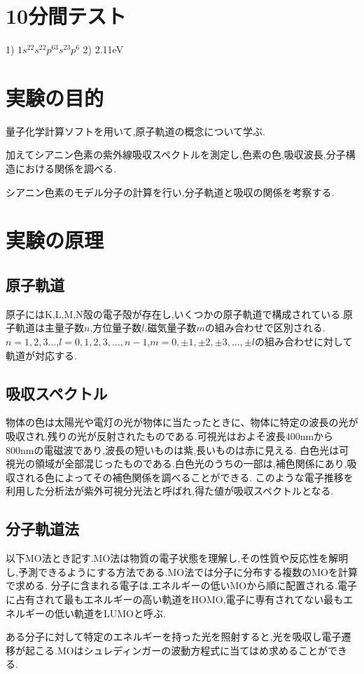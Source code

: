 \documentclass[a4j,10pt,dvipdfmx]{jarticle}
\begin{document}
\section{10分間テスト}
 1) $1s^22s^22p^63s^23p^6$
 2) 2.11eV
  \section{実験の目的}
  量子化学計算ソフトを用いて,原子軌道の概念について学ぶ.
  
  加えてシアニン色素の紫外線吸収スペクトルを測定し,色素の色,吸収波長,分子構造における関係を調べる.

  シアニン色素のモデル分子の計算を行い,分子軌道と吸収の関係を考察する.

  \section{実験の原理}
  \subsection{原子軌道}
  原子にはK,L,M,N殻の電子殻が存在し,いくつかの原子軌道で構成されている.原子軌道は主量子数$n$,方位量子数$l$,磁気量子数$m$の組み合わせで区別される.
  $n=1,2,3...$,$l= 0,1,2,3,...,n-1$,$m=0,\pm1,\pm2,\pm3,...,\pm{l}$の組み合わせに対して軌道が対応する.


  \subsection{吸収スペクトル}
  物体の色は太陽光や電灯の光が物体に当たったときに、物体に特定の波長の光が吸収され,残りの光が反射されたものである.可視光はおよそ波長400nmから800nmの電磁波であり,波長の短いものは紫,長いものは赤に見える.
  白色光は可視光の領域が全部混じったものである.白色光のうちの一部は,補色関係にあり,吸収される色によってその補色関係を調べることができる.
  このような電子推移を利用した分析法が紫外可視分光法と呼ばれ,得た値が吸収スペクトルとなる.
  \subsection{分子軌道法}
  以下MO法とき記す.MO法は物質の電子状態を理解し,その性質や反応性を解明し,予測できるようにする方法である.MO法では分子に分布する複数のMOを計算で求める.
  分子に含まれる電子は,エネルギーの低いMOから順に配置される.電子に占有されて最もエネルギーの高い軌道をHOMO,電子に専有されてない最もエネルギーの低い軌道をLUMOと呼ぶ.

  ある分子に対して特定のエネルギーを持った光を照射すると,光を吸収し電子遷移が起こる.MOはシュレディンガーの波動方程式に当てはめ求めることができる.
\end{document}
